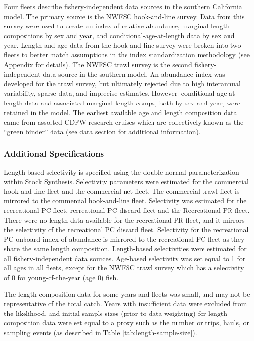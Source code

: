 \documentclass[
  english,
  a4paper,
]{article}
\begin{document}
Four fleets describe fishery-independent data sources in the southern California model. The primary source is the NWFSC hook-and-line survey. Data from this survey were used to create an index of relative abundance, marginal length compositions by sex and year, and conditional-age-at-length data by sex and year. Length and age data from the hook-and-line survey were broken into two fleets to better match assumptions in the index standardization methodology (see Appendix for details). The NWFSC trawl survey is the second fishery-independent data source in the southern model. An abundance index was developed for the trawl survey, but ultimately rejected due to high interannual variability, sparse data, and imprecise estimates. However, conditional-age-at-length data and associated marginal length comps, both by sex and year, were retained in the model. The earliest available age and length composition data came from assorted CDFW research cruises which are collectively known as the ``green binder'' data (see data section for additional information).

\hypertarget{additional-specifications}{%
\subsubsection{Additional Specifications}\label{additional-specifications}}

Length-based selectivity is specified using the double normal parameterization within Stock Synthesis. Selectivity parameters were estimated for the commercial hook-and-line fleet and the commercial net fleet. The commercial trawl fleet is mirrored to the commercial hook-and-line fleet. Selectivity was estimated for the recreational PC fleet, recreational PC discard fleet and the Recreational PR fleet. There were no length data available for the recreational PR fleet, and it mirrors the selectivity of the recreational PC discard fleet. Selectivity for the recreational PC onboard index of abundance is mirrored to the recreational PC fleet as they share the same length composition. Length-based selectivities were estimated for all fishery-independent data sources. Age-based selectivity was set equal to 1 for all ages in all fleets, except for the NWFSC trawl survey which has a selectivity of 0 for young-of-the-year (age 0) fish.

The length composition data for some years and fleets was small, and may not be
representative of the total catch. Years with insufficient data were excluded from the likelihood, and initial sample sizes (prior to data weighting) for length composition data were set equal to a proxy such as the number or trips, hauls, or sampling events (as described in Table \ref{tab:length-sample-size}).
\end{document}
